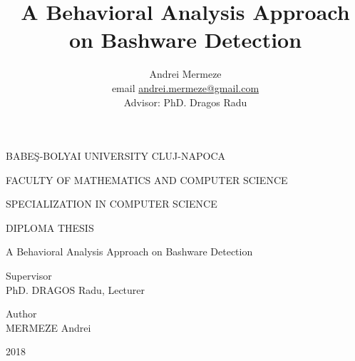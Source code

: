 \documentclass[12pt]{extreport}
\title{A Behavioral Analysis Approach on Bashware Detection}
\author{
        Andrei Mermeze
        \\ email \href{mailto:andrei.mermeze@gmail.com}{andrei.mermeze@gmail.com}
        \\ [1cm]{\normalsize Advisor: PhD. Dragos Radu}
    }
\date{}
\begin{document}
    \begin{titlepage}

    \begin{center}
    {\Large BABEŞ-BOLYAI UNIVERSITY CLUJ-NAPOCA}
    \end{center}

    \begin{center}
    {\Large FACULTY OF MATHEMATICS AND COMPUTER SCIENCE}
    \end{center}

    \begin{center}
    {\Large SPECIALIZATION IN COMPUTER SCIENCE}
    \end{center}

    \vfill

    \begin{center}
    {\LARGE DIPLOMA THESIS}
    \end{center}

    \begin{center}
    {\Huge A Behavioral Analysis Approach on Bashware Detection}
    \end{center}

    \vfill

    \begin{flushleft}
    {\LARGE Supervisor \\ PhD. DRAGOS Radu, Lecturer}
    \end{flushleft}

    \begin{flushright}
    {\Large Author \\ MERMEZE Andrei}
    \end{flushright}

    \vfill

    \begin{center}
    {\LARGE 2018}
    \end{center}

    \pagebreak

    
    
    

\end{titlepage}
\end{document}
